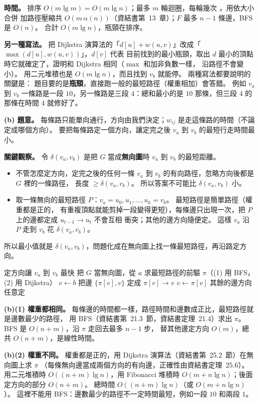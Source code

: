 \begin{pastsoln}
\textbf{時間。} 排序 $O(m \lg m) = O(m \lg n)$；最多 $m$ 輪迴圈，每輪幾次 ，用依大小合併
加路徑壓縮共 $O(m\,\alpha(n))$（資結書第~13~章）；$F$ 最多 $n - 1$ 條邊，BFS 是 $O(n)$。 合計
$O(m \lg n)$，瓶頸在排序。

\textbf{另一種寫法。} 把 Dijkstra 演算法的「$d[u] + w(u, v)$」改成「$\max(d[u], w(u, v))$」，$d[v]$ 代表
目前找到的最小瓶頸，取出 $d$ 最小的頂點時它就確定了，證明和 Dijkstra 相同（$\max$ 和加非負數一樣，
沿路徑不會變小）。 用二元堆積也是 $O(m \lg n)$，而且找到 $v_b$ 就能停。 兩種寫法都要說明的關鍵是：
題目要的是\textbf{瓶頸}，直接跑一般的最短路徑（權重相加）會答錯。 例如 $v_a$ 到 $v_b$ 一條路是一段
$10$，另一條路是三段 $4$：總和最小的是 $10$ 那條，但三段 $4$ 的那條在時間 $4$ 就修好了。

\textbf{(b) 題意。} 每條路只能單向通行，方向由我們決定；$w_{ij}$ 是走這條路的時間（不論定成哪個方向）。
要把每條路定一個方向，讓定完之後 $v_a$ 到 $v_b$ 的最短行走時間最小。

\textbf{關鍵觀察。} 令 $\delta(v_a, v_b)$ 是把 $G$ 當成\textbf{無向圖}時 $v_a$ 到 $v_b$ 的最短距離。
\begin{itemize}
\item 不管怎麼定方向，定完之後的任何一條 $v_a$ 到 $v_b$ 的有向路徑，忽略方向後都是 $G$ 裡的一條路徑，
長度 $\ge \delta(v_a, v_b)$。 所以答案不可能比 $\delta(v_a, v_b)$ 小。
\item 取一條無向的最短路徑 $P$：$v_a = u_0, u_1, \ldots, u_k = v_b$。 最短路徑是簡單路徑（權重都是正的，
有重複頂點就能剪掉一段變得更短），每條邊只出現一次，把 $P$ 上的邊都定成 $u_{t-1} \to u_t$ 不會互相
衝突；其他的邊方向隨便定。 這樣 $v_a$ 沿 $P$ 走到 $v_b$ 花 $\delta(v_a, v_b)$。
\end{itemize}
所以最小值就是 $\delta(v_a, v_b)$，問題化成在無向圖上找一條最短路徑，再沿路定方向。
\begin{pseudo}{定方向讓 $v_a$ 到 $v_b$ 最快}
    \State 把 $G$ 當無向圖，從 $a$ 求最短路徑的前驅 $\pi$（(1) 用 BFS，(2) 用 Dijkstra）
    \State $v \gets b$
        \State 把邊 $\{\pi[v], v\}$ 定成 $\pi[v] \to v$
        \State $v \gets \pi[v]$
    \EndWhile
    \State 其餘的邊方向任意定
\EndProcedure
\end{pseudo}

\textbf{(b)(1) 權重都相同。} 每條邊的時間都一樣，路徑時間和邊數成正比，最短路徑就是邊數最少的路徑，
用 BFS（資結書第~21.3~節，資結書定理~21.4）求出 $\pi$。 BFS 是 $O(n + m)$，沿 $\pi$ 走回去最多 $n - 1$ 步，
替其他邊定方向 $O(m)$，總共 $O(n + m)$，是線性時間。

\textbf{(b)(2) 權重不同。} 權重都是正的，用 Dijkstra 演算法（資結書第~25.2~節）在無向圖上求 $\pi$
（每條無向邊當成兩個方向的有向邊，正確性由資結書定理~25.6）。 用二元堆積時 $O((n + m) \lg n)$，用
Fibonacci 堆積時 $O(m + n \lg n)$；後面定方向的部分 $O(n + m)$。 總時間 $O((n + m) \lg n)$（或
$O(m + n \lg n)$）。 這裡不能用 BFS：邊數最少的路徑不一定時間最短，例如一段 $10$ 和兩段 $1$。
\end{pastsoln}
